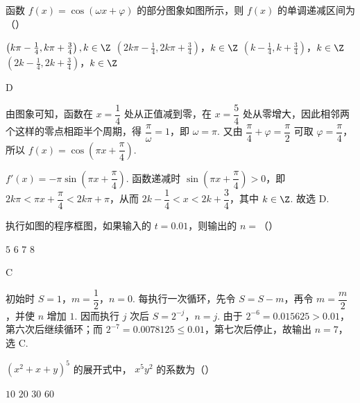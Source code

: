 \begin{problem}
函数 \( f(x) = \cos (\omega x + \varphi) \) 的部分图象如图所示，则 \( f(x) \) 的单调递减区间为（\quad）


\choices
    {\(\left(k\pi -\frac{1}{4},k\pi +\frac{3}{4}\right),k\in \Z\)}
    {\(\left(2k\pi -\frac{1}{4},2k\pi +\frac{3}{4}\right)\)，\(k\in \Z\)}
    {\(\left(k - \frac{1}{4}, k + \frac{3}{4}\right)\)，\(k \in \Z\)}
    {\(\left(2k - \frac{1}{4}, 2k + \frac{3}{4}\right)\)，\(k \in \Z\)}
\end{problem}

\begin{answer}
D
\end{answer}

\begin{solution}
由图象可知，函数在 \(x=\dfrac14\) 处从正值减到零，在 \(x=\dfrac54\) 处从零增大，因此相邻两个这样的零点相距半个周期，得 \(\dfrac{\pi}{\omega}=1\)，即 \(\omega=\pi\). 又由 \(\dfrac\pi4+\varphi=\dfrac\pi2\) 可取 \(\varphi=\dfrac\pi4\)，所以 \(f(x)=\cos\left(\pi x+\dfrac\pi4\right)\).

\(f'(x)=-\pi\sin\left(\pi x+\dfrac\pi4\right)\). 函数递减时 \(\sin\left(\pi x+\dfrac\pi4\right)>0\)，即
\(2k\pi<\pi x+\dfrac\pi4<2k\pi+\pi\)，从而 \(2k-\dfrac14<x<2k+\dfrac34\)，其中 \(k\in\Z\). 故选 D.
\end{solution}

\begin{problem}
执行如图的程序框图，如果输入的 \(t = 0.01\)，则输出的 \(n =\)（\quad）


\choices
    {\(5\)}
    {\(6\)}
    {\(7\)}
    {\(8\)}
\end{problem}

\begin{answer}
C
\end{answer}

\begin{solution}
初始时 \(S=1\)，\(m=\dfrac12\)，\(n=0\). 每执行一次循环，先令 \(S=S-m\)，再令 \(m=\dfrac m2\)，并使 \(n\) 增加 \(1\). 因而执行 \(j\) 次后 \(S=2^{-j}\)，\(n=j\). 由于 \(2^{-6}=0.015625>0.01\)，第六次后继续循环；而 \(2^{-7}=0.0078125\leqslant0.01\)，第七次后停止，故输出 \(n=7\)，选 C.
\end{solution}

\begin{problem}
\((x^{2} + x + y)^{5}\) 的展开式中， \(x^{5}y^{2}\) 的系数为（\quad）

\choices
    {\(10\)}
    {\(20\)}
    {\(30\)}
    {\(60\)}
\end{problem}

